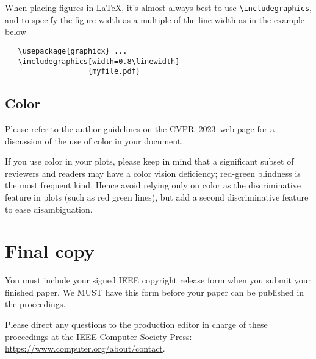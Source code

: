 \documentclass[10pt,twocolumn,letterpaper]{article}
\def\confName{CVPR}
\def\confYear{2023}
\begin{document}
    When placing figures in \LaTeX, it's almost always best to use \verb+\includegraphics+, and to specify the figure width as a multiple of the line width as in the example below
        {\small\begin{verbatim}
   \usepackage{graphicx} ...
   \includegraphics[width=0.8\linewidth]
                   {myfile.pdf}
    \end{verbatim}
    }



    \subsection{Color}

    Please refer to the author guidelines on the \confName\ \confYear\ web page for a discussion of the use of color in your document.

    If you use color in your plots, please keep in mind that a significant subset of reviewers and readers may have a color vision deficiency; red-green blindness is the most frequent kind.
    Hence avoid relying only on color as the discriminative feature in plots (such as red \vs green lines), but add a second discriminative feature to ease disambiguation.



    \section{Final copy}

    You must include your signed IEEE copyright release form when you submit your finished paper.
    We MUST have this form before your paper can be published in the proceedings.

    Please direct any questions to the production editor in charge of these proceedings at the IEEE Computer Society Press:
    \url{https://www.computer.org/about/contact}.


        {\small
    
    
    }
\end{document}
